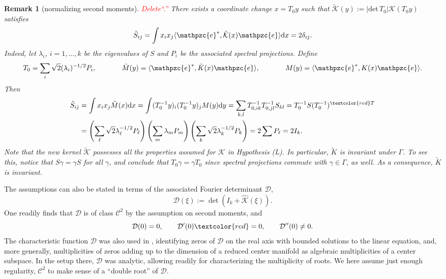 \documentclass[10pt]{article}
\newtheorem{Remark}[Lemma]{Remark}
\newcommand{\rmd}{\mathrm{d}}
\newcommand{\K}{\mathcal{K}}
\newcommand{\e}{\mathpzc{e}}
\begin{document}
\begin{Remark}[normalizing second moments]\label{r:rs}\textcolor{red}{Delete``.''} There exists a coordinate change $x=T_0y$ such that $\tilde{\K}(y):=|\mathrm{det}\,T_0|\K(T_0y)$ satisfies
\[
\tilde{S}_{ij}=\int x_ix_j\langle {\e}^*,\tilde{\K}(x) {\e}\rangle\rmd x=2\delta_{ij}.
\]
Indeed, let $\lambda_i$, $i=1,\ldots,k$ be the eigenvalues of $S$ and $P_i$ be the associated spectral projections. Define
\[
T_0 = \sum_{i} \sqrt{2}(\lambda_i)^{-1/2} P_i, \hspace{0.5in} \tilde{M}(y) = \langle {\e}^*, \tilde{K}(x){\e} \rangle ,\hspace{0.5in}  {M}(y) = \langle {\e}^*, {K}(x){\e} \rangle .
\]
Then
\begin{align*}
\tilde{S}_{ij} &= \int x_ix_j \tilde{M}(x) \rmd x 
= \int (T_0^{-1}y)_i(T_0^{-1}y)_jM(y)\rmd y
= \sum_{k,l}T^{-1}_{0,ik}T^{-1}_{0,jl}S_{kl}
= T_0^{-1}S(T_0^{-1})^{\textcolor{red}T}\\
&=\left(\sum_\ell \sqrt{2}\lambda_\ell^{-1/2}P_\ell\right)\left(\sum_m \lambda_m P_m\right)\left(\sum_k \sqrt{2}\lambda_k^{-1/2}P_k\right)=2\sum P_\ell=2I_k.
\end{align*}
Note that the new kernel $\tilde{\K}$ possesses all the properties assumed for $\K$ in Hypothesis (L). In particular, $\tilde{K}$ is invariant under $\Gamma$. To see this, notice that $S\gamma=\gamma S$ for all $\gamma$, and conclude that $T_0\gamma=\gamma T_0$ since spectral projections commute with $\gamma\in\Gamma$, as well. As a consequence, $\tilde{K}$ is invariant. 
\end{Remark}

The assumptions can also be stated in terms of the associated Fourier determinant $\mathcal{D}$,
\[
\mathcal{D}(\xi):=\det(I_k+\widehat{\K}(\xi)).
\]
One readily finds that $\mathcal{D}$ is of class $\mathscr{C}^2$ by the assumption on second moments, and 
\[
\mathcal{D}(0)=0,\qquad  \mathcal{D}'(0)\textcolor{red}=0, \qquad  \mathcal{D}''(0)\neq 0.
\]
The characteristic function $\mathcal{D}$ was also used in \cite{FScmfd}, identifying zeros of $\mathcal{D}$ on the real axis with bounded solutions to the linear equation, and, more generally, multiplicities of zeros adding up to the dimension of a reduced center manifold as algebraic multiplicities of a center subspace. In the setup there, $\mathcal{D}$ was analytic, allowing readily for characterizing the multiplicity of roots. We here assume just enough regularity, $\mathscr{C}^2$ to make sense of a ``double root'' of $\mathcal{D}$.
\end{document}
